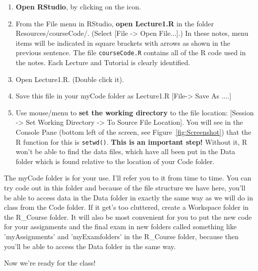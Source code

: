 \documentclass[titlepage]{book}
\begin{document}
\begin{enumerate}

\item {\textbf{Open RStudio}, by clicking on the icon.}

\item{From the File menu in RStudio, \textbf{open Lecture1.R} in the folder Resources/courseCode/. (Select [File -> Open File...].) In these notes, menu items will be indicated in square brackets with arrows as shown in the previous sentence.  The file \texttt{courseCode.R} contains all of the R code used in the notes.  Each Lecture and Tutorial is clearly identified. } 

\item{Open Lecture1.R. (Double click it). }

\item{Save this file in your myCode folder as Lecture1.R   [File-> Save As ....]}

\item{Use mouse/menu to \textbf{set the working directory} to the file location: [Session -> Set Working Directory -> To Source File Location]. You will see in the Console Pane (bottom left of the screen, see Figure~\ref{fig:Screenshot}) that the R function for this is \texttt{setwd()}.   \textbf{This is an important step!}  Without it, R won't be able to find the data files, which have all been put in the Data folder which is found relative to the location of your Code folder.}

\end{enumerate}

The myCode folder is for your use.  I'll refer you to it from time to time. You can try code out in this folder and because of the file structure we have here, you'll be able to  access data in the Data folder in exactly the same way as we will do in class from the Code folder. If it get's too cluttered, create a Workspace folder in the R\_Course folder.
It will also be most convenient for you to put the new code for your assignments and the final exam in new folders called something like  'myAssignments' and 'myExamfolders' in the R\_Course folder, because then you'll be able to access the Data folder in the same way.

Now we're ready for the class!
\end{document}
